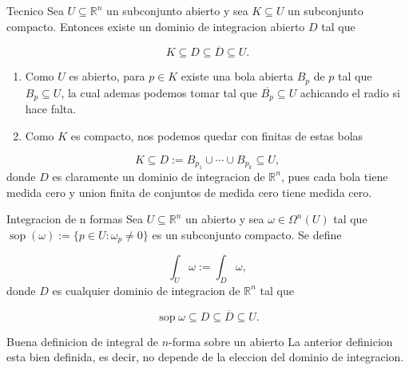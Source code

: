\begin{booklemma}{Tecnico}
Sea $U\subseteq\mathbb R^n$ un subconjunto abierto y sea $K\subseteq U$ un subconjunto compacto. Entonces existe un dominio de integracion abierto $D$ tal que

\[
K\subseteq D\subseteq\overline D\subseteq U.
\]
\end{booklemma}
\begin{bookproof}{}
\begin{enumerate}
\item Como $U$ es abierto, para $p\in K$ existe una bola abierta $B_p$ de $p$ tal que $B_p\subseteq U$, la cual ademas podemos tomar tal que $\overline{B_p}\subseteq U$ achicando el radio si hace falta.
\item Como $K$ es compacto, nos podemos quedar con finitas de estas bolas
\end{enumerate}
\[
K\subseteq D:=B_{p_1}\cup\cdots\cup B_{p_k}\subseteq U,
\]
donde $D$ es claramente un dominio de integracion de $\mathbb R^n$, pues cada bola tiene medida cero y union finita de conjuntos de medida cero tiene medida cero.

\bookqed
\end{bookproof}
\label{blk:322b65}
\begin{bookdefinition}{Integracion de n formas}
Sea $U\subseteq\mathbb R^n$ un abierto y sea $\omega\in\Omega^n(U)$ tal que $\operatorname{sop}(\omega):=\{p\in U:\omega_p\neq0\}$ es un subconjunto compacto. Se define

\[
\int_U\omega:=\int_D\omega,
\]
donde $D$ es cualquier dominio de integracion de $\mathbb R^n$ tal que

\[
\operatorname{sop}\omega\subseteq D\subseteq\overline D\subseteq U.
\]
\end{bookdefinition}
\label{blk:de3f7e}
\begin{bookproposition}{Buena definicion de integral de $n$-forma sobre un abierto}
La anterior definicion esta bien definida, es decir, no depende de la eleccion del dominio de integracion.

\end{bookproposition}
